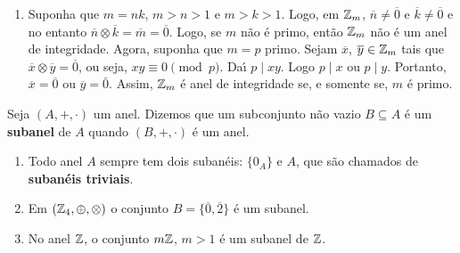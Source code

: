 \begin{exemplos}
\begin{enumerate}[label={\arabic*})]
		\item Suponha que $m = nk$, $m > n > 1$ e $m > k > 1$. Logo, em $\mathbb{Z}_m$, $\overline{n} \neq \overline{0}$ e $\overline{k} \neq \overline{0}$ e no entanto $\overline{n} \otimes \overline{k} = \overline{m} = \overline{0}$. Logo, se $m$ n{\~a}o {\'e} primo, ent{\~a}o $\mathbb{Z}_m$ n{\~a}o {\'e} um anel de integridade. Agora, suponha que $m = p$ primo. Sejam $\overline{x}$, $\overline{y} \in \mathbb{Z}_m$ tais que $\overline{x}\otimes \overline{y} = \overline{0}$, ou seja, $xy \equiv 0 \pmod p$. Da{\'\i} $p\mid xy$. Logo $p\mid x$ ou $p\mid y$. Portanto, $\overline{x} = \overline{0}$ ou $\overline{y} = \bar{0}$. Assim, $\mathbb{Z}_m$ {\'e} anel de integridade se, e somente se, $m$ {\'e} primo.
	\end{enumerate}
\end{exemplos}



\begin{definicao}
	Seja $(A, +, \cdot)$ um anel. Dizemos que um subconjunto n{\~a}o vazio $B\subseteq A$ {\'e} um \textbf{subanel} de $A$ quando $(B, +, \cdot)$ \'e um anel.
\end{definicao}

\begin{exemplos}
	\begin{enumerate}[label={\arabic*})]
		\item Todo anel $A$ sempre tem dois suban{\'e}is: $\{0_{A}\}$ e $A$, que s{\~a}o chamados de \textbf{suban{\'e}is triviais}.
		\item Em $(\mathbb{Z}_4,\oplus,\otimes)$ o conjunto $B = \{\overline{0}, \overline{2}\}$ \'e um subanel.
		\item No anel $\mathbb{Z}$, o conjunto $m\mathbb{Z}$, $m > 1$ {\'e} um subanel de $\mathbb{Z}$.
	\end{enumerate}
\end{exemplos}

